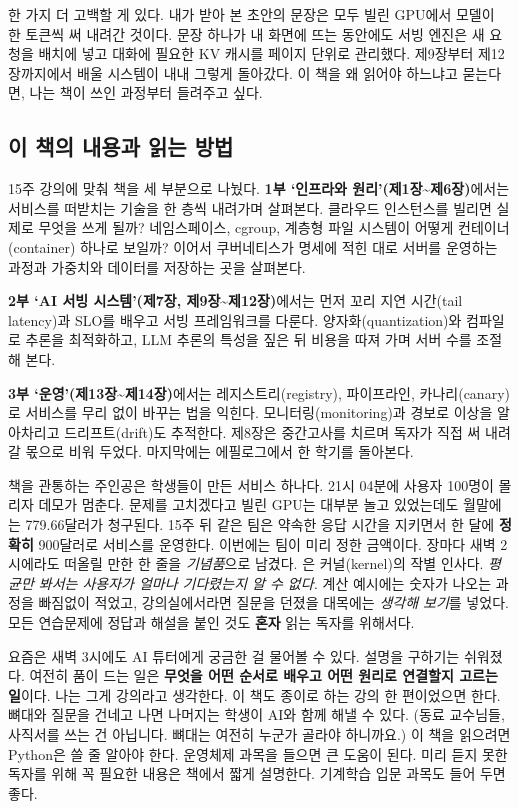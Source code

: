 한 가지 더 고백할 게 있다. 내가 받아 본 초안의 문장은 모두 빌린 GPU에서 모델이 한 토큰씩 써 내려간 것이다. 문장 하나가 내 화면에 뜨는 동안에도 서빙 엔진은 새 요청을 배치에 넣고 대화에 필요한 KV 캐시를 페이지 단위로 관리했다. 제9장부터 제12장까지에서 배울 시스템이 내내 그렇게 돌아갔다. 이 책을 왜 읽어야 하느냐고 묻는다면, 나는 책이 쓰인 과정부터 들려주고 싶다.

\subsection*{이 책의 내용과 읽는 방법}

15주 강의에 맞춰 책을 세 부분으로 나눴다. \textbf{1부 ‘인프라와 원리’(제1장\textasciitilde{}제6장)}에서는 서비스를 떠받치는 기술을 한 층씩 내려가며 살펴본다. 클라우드 인스턴스를 빌리면 실제로 무엇을 쓰게 될까? 네임스페이스, cgroup, 계층형 파일 시스템이 어떻게 컨테이너(container) 하나로 보일까? 이어서 쿠버네티스가 명세에 적힌 대로 서버를 운영하는 과정과 가중치와 데이터를 저장하는 곳을 살펴본다.

\textbf{2부 ‘AI 서빙 시스템’(제7장, 제9장\textasciitilde{}제12장)}에서는 먼저 꼬리 지연 시간(tail latency)과 SLO를 배우고 서빙 프레임워크를 다룬다. 양자화(quantization)와 컴파일로 추론을 최적화하고, LLM 추론의 특성을 짚은 뒤 비용을 따져 가며 서버 수를 조절해 본다.

\textbf{3부 ‘운영’(제13장\textasciitilde{}제14장)}에서는 레지스트리(registry), 파이프라인, 카나리(canary)로 서비스를 무리 없이 바꾸는 법을 익힌다. 모니터링(monitoring)과 경보로 이상을 알아차리고 드리프트(drift)도 추적한다. 제8장은 중간고사를 치르며 독자가 직접 써 내려갈 몫으로 비워 두었다. 마지막에는 에필로그에서 한 학기를 돌아본다.

책을 관통하는 주인공은 학생들이 만든 서비스 하나다. 21시 04분에 사용자 100명이 몰리자 데모가 멈춘다. 문제를 고치겠다고 빌린 GPU는 대부분 놀고 있었는데도 월말에는 779.66달러가 청구된다. 15주 뒤 같은 팀은 약속한 응답 시간을 지키면서 한 달에 \textbf{정확히} 900달러로 서비스를 운영한다. 이번에는 팀이 미리 정한 금액이다. 장마다 새벽 2시에라도 떠올릴 만한 한 줄을 \textit{기념품}으로 남겼다. 은 커널(kernel)의 작별 인사다. \textit{평균만 봐서는 사용자가 얼마나 기다렸는지 알 수 없다.} 계산 예시에는 숫자가 나오는 과정을 빠짐없이 적었고, 강의실에서라면 질문을 던졌을 대목에는 \textit{생각해 보기}를 넣었다. 모든 연습문제에 정답과 해설을 붙인 것도 \textbf{혼자} 읽는 독자를 위해서다.

요즘은 새벽 3시에도 AI 튜터에게 궁금한 걸 물어볼 수 있다. 설명을 구하기는 쉬워졌다. 여전히 품이 드는 일은 \textbf{무엇을 어떤 순서로 배우고 어떤 원리로 연결할지 고르는 일}이다. 나는 그게 강의라고 생각한다. 이 책도 종이로 하는 강의 한 편이었으면 한다. 뼈대와 질문을 건네고 나면 나머지는 학생이 AI와 함께 해낼 수 있다. (동료 교수님들, 사직서를 쓰는 건 아닙니다. 뼈대는 여전히 누군가 골라야 하니까요.) 이 책을 읽으려면 Python은 쓸 줄 알아야 한다. 운영체제 과목을 들으면 큰 도움이 된다. 미리 듣지 못한 독자를 위해 꼭 필요한 내용은 책에서 짧게 설명한다. 기계학습 입문 과목도 들어 두면 좋다.

